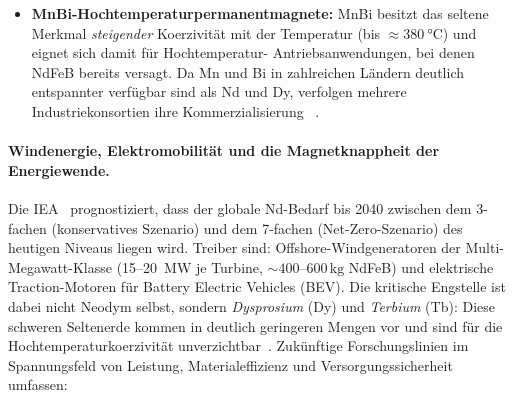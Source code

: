﻿\documentclass[12pt, a4paper]{report}
\theoremstyle{definition}
\theoremstyle{remark}
\begin{document}
\begin{itemize}
  \item \textbf{MnBi-Hochtemperaturpermanentmagnete:}
    MnBi besitzt das seltene Merkmal \emph{steigender} Koerzivität mit der
    Temperatur (bis $\approx \SI{380}{\celsius}$) und eignet sich damit für Hochtemperatur-
    Antriebsanwendungen, bei denen NdFeB bereits versagt. Da Mn und Bi in
    zahlreichen Ländern deutlich entspannter verfügbar sind als Nd und Dy,
    verfolgen mehrere Industriekonsortien ihre Kommerzialisierung ~\cite{lewis2013}.
\end{itemize}

\paragraph{Windenergie, Elektromobilität und die Magnetknappheit der
Energiewende.}
Die IEA~\cite{iea2024} prognostiziert, dass der globale Nd-Bedarf bis 2040
zwischen dem 3-fachen (konservatives Szenario) und dem 7-fachen
(Net-Zero-Szenario) des heutigen Niveaus liegen wird. Treiber sind:
Offshore-Windgeneratoren der Multi-Megawatt-Klasse (15--20~MW je Turbine,
$\sim400$--$600\,\text{kg}$ NdFeB) und elektrische Traction-Motoren für
Battery Electric Vehicles (BEV). Die kritische Engstelle ist dabei nicht
Neodym selbst, sondern \emph{Dysprosium} (Dy) und \emph{Terbium} (Tb): Diese
schweren Seltenerde kommen in deutlich geringeren Mengen vor und sind für
die Hochtemperaturkoerzivität unverzichtbar~\cite{alonso2012}. Zukünftige
Forschungslinien im Spannungsfeld von Leistung, Materialeffizienz und
Versorgungssicherheit umfassen:
\end{document}
